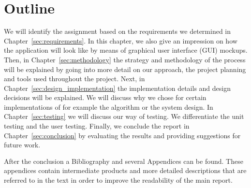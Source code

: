 \section{Outline}
We will identify the assignment based on the requirements we determined in Chapter~\ref{sec:requirements}. 
In this chapter, we also give an impression on how the application will look like by means of graphical user interface (GUI) mockups.
Then, in Chapter~\ref{sec:methodology} the strategy and methodology of the process will be explained by going into more detail on our approach, the project planning and tools used throughout the project.
Next, in Chapter~\ref{sec:design_implementation} the implementation details and design decisions will be explained.
We will discuss why we chose for certain implementations of for example the algorithm or the system design.
In Chapter~\ref{sec:testing} we will discuss our way of testing. 
We differentiate the unit testing and the user testing.
Finally, we conclude the report in Chapter~\ref{sec:conclusion} by evaluating the results and providing suggestions for future work.

After the conclusion a Bibliography and several Appendices can be found. 
These appendices contain intermediate products and more detailed descriptions that are referred to in the text in order to improve the readability of the main report.
